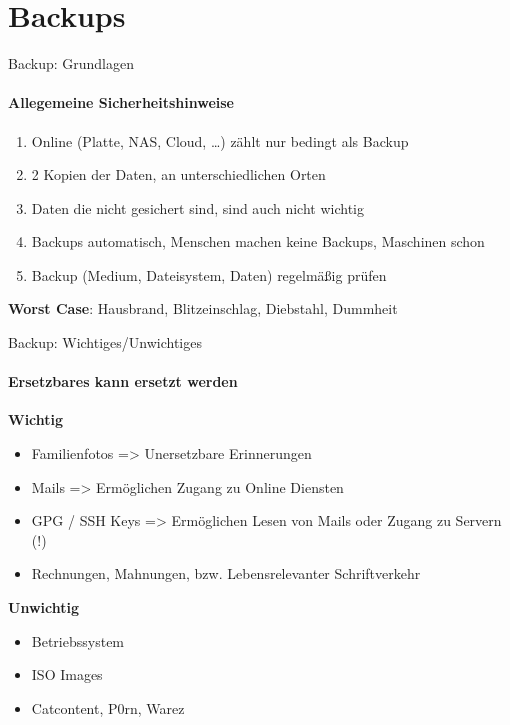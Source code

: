 \section{Backups}

\begin{frame}{Backup: Grundlagen}
\framesubtitle{Allegemeine Sicherheitshinweise}
\begin{enumerate}
\item Online (Platte, NAS, Cloud, …) zählt nur bedingt als Backup
\pause
\item 2 Kopien der Daten, an unterschiedlichen Orten
\pause
\item Daten die nicht gesichert sind, sind auch nicht wichtig
\pause
\item Backups automatisch, Menschen machen keine Backups, Maschinen schon
\pause
\item Backup (Medium, Dateisystem, Daten) regelmäßig prüfen
\end{enumerate}
\pause
\textbf{Worst Case}: Hausbrand, Blitzeinschlag, Diebstahl, Dummheit
\end{frame}

\begin{frame}{Backup: Wichtiges/Unwichtiges}
\framesubtitle{Ersetzbares kann ersetzt werden}
\pause
\textbf{Wichtig}
\begin{itemize}
\item Familienfotos => Unersetzbare Erinnerungen
\pause
\item Mails => Ermöglichen Zugang zu Online Diensten
\pause
\item GPG / SSH Keys => Ermöglichen Lesen von Mails oder Zugang zu Servern (!)
\pause
\item Rechnungen, Mahnungen, bzw. Lebensrelevanter Schriftverkehr
\end{itemize}
\pause
\textbf{Unwichtig}
\begin{itemize}
\item Betriebssystem
\pause
\item ISO Images
\pause
\item Catcontent, P0rn, Warez
\end{itemize}
\end{frame}
